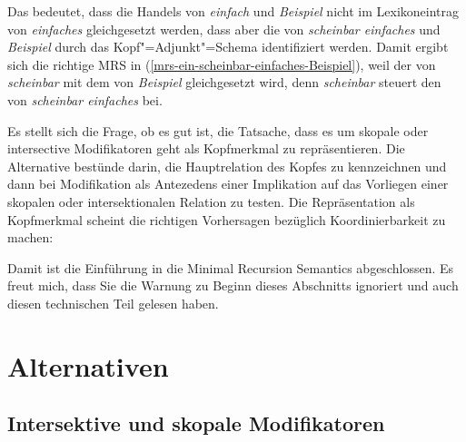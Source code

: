 \noindent
Das bedeutet, dass die Handels von \emph{einfach} und \emph{Beispiel} nicht im
Lexikoneintrag von \emph{einfaches} gleichgesetzt werden, dass aber die \ltopwe von \emph{scheinbar
  einfaches} und \emph{Beispiel} durch das Kopf"=Adjunkt"=Schema identifiziert werden. Damit ergibt
sich die richtige MRS in (\ref{mrs-ein-scheinbar-einfaches-Beispiel}), weil der \ltopw von
\emph{scheinbar} mit dem von \emph{Beispiel} gleichgesetzt wird, denn \emph{scheinbar} steuert
den \ltopw von \emph{scheinbar einfaches} bei.

Es stellt sich die Frage, ob es gut ist, die Tatsache, dass es um skopale oder intersective
Modifikatoren geht als Kopfmerkmal zu repräsentieren. Die Alternative bestünde darin, die
Hauptrelation des Kopfes zu kennzeichnen und dann bei Modifikation als Antezedens einer Implikation
auf das Vorliegen einer skopalen oder intersektionalen Relation zu testen. Die Repräsentation als
Kopfmerkmal scheint die richtigen Vorhersagen bezüglich Koordinierbarkeit zu machen:
\eal
{}
\zl


Damit ist die Einführung in die Minimal Recursion Semantics abgeschlossen. Es freut mich, dass Sie
die Warnung zu Beginn dieses Abschnitts ignoriert und auch diesen technischen Teil gelesen haben.

%


\section{Alternativen}

\subsection{Intersektive und skopale Modifikatoren}

